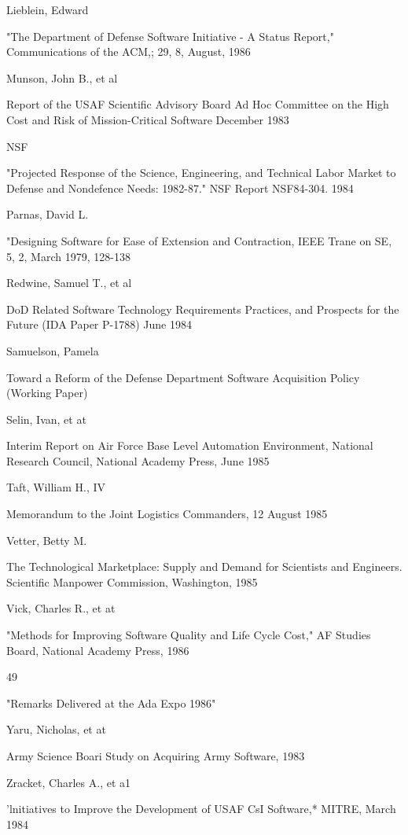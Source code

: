 \documentclass[12pt]{article}
\begin{document}
Lieblein, Edward

"The Department of Defense Software Initiative - A Status
Report," Communications of the ACM,; 29, 8, August, 1986

Munson, John B., et al

Report of the USAF Scientific Advisory Board Ad Hoc
Committee on the High Cost and Risk of Mission-Critical
Software December 1983

NSF

"Projected Response of the Science, Engineering, and
Technical Labor Market to Defense and Nondefence Needs:
1982-87." NSF Report NSF84-304. 1984

Parnas, David L.

"Designing Software for Ease of Extension and
Contraction, IEEE Trane on SE, 5, 2, March 1979, 128-138

Redwine, Samuel T., et al

DoD Related Software Technology Requirements Practices,
and Prospects for the Future
(IDA Paper P-1788) June 1984

Samuelson, Pamela

Toward a Reform of the Defense Department Software
Acquisition Policy (Working Paper)

Selin, Ivan, et at

Interim Report on Air Force Base Level Automation
Environment, National Research Council, National Academy
Press, June 1985

Taft, William H., IV

Memorandum to the Joint Logistics Commanders,
12 August 1985

Vetter, Betty M.

The Technological Marketplace: Supply and Demand
for Scientists and Engineers. Scientific Manpower Commission,
Washington, 1985

Vick, Charles R., et at

"Methods for Improving Software Quality and Life Cycle
Cost," AF Studies Board, National Academy Press, 1986

49


"Remarks Delivered at the Ada Expo 1986"

Yaru, Nicholas, et at

Army Science Boari Study on Acquiring Army Software, 1983

Zracket, Charles A., et a1

'lnitiatives to Improve the Development of USAF CsI
Software,* MITRE, March 1984
\end{document}
